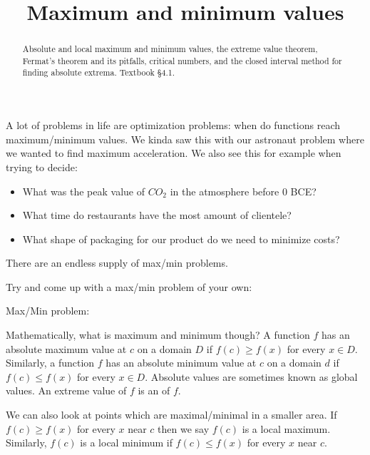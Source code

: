 \documentclass{ximera}
\title{Maximum and minimum values}
\begin{document}
\begin{abstract}
Absolute and local maximum and minimum values, the extreme value theorem, Fermat's theorem and its pitfalls, critical numbers, and the closed interval method for finding absolute extrema. Textbook §4.1.
\end{abstract}
\maketitle

A lot of problems in life are optimization problems: when do functions reach maximum/minimum values. We kinda saw this with our astronaut problem where we wanted to find maximum acceleration. We also see this for example when trying to decide:
\begin{itemize}
  \item What was the peak value of $C O_{2}$ in the atmosphere before 0 BCE?
  \item What time do restaurants have the most amount of clientele?
  \item What shape of packaging for our product do we need to minimize costs?
\end{itemize}

There are an endless supply of max/min problems.

\begin{exercise}\label{exercise:9-3}
Try and come up with a max/min problem of your own:

Max/Min problem:
\begin{freeResponse}\end{freeResponse}
\end{exercise}

Mathematically, what is maximum and minimum though? A function $f$ has an absolute maximum value at $c$ on a domain $D$ if $f(c) \geq f(x)$ for every $x \in D$. Similarly, a function $f$ has an absolute minimum value at $c$ on a domain $d$ if $f(c) \leq f(x)$ for every $x \in D$. Absolute values are sometimes known as global values. An extreme value of $f$ is an  of $f$.

We can also look at points which are maximal/minimal in a smaller area. If $f(c) \geq f(x)$ for every $x$ near $c$ then we say $f(c)$ is a local maximum. Similarly, $f(c)$ is a local minimum if $f(c) \leq f(x)$ for every $x$ near $c$.
\end{document}
